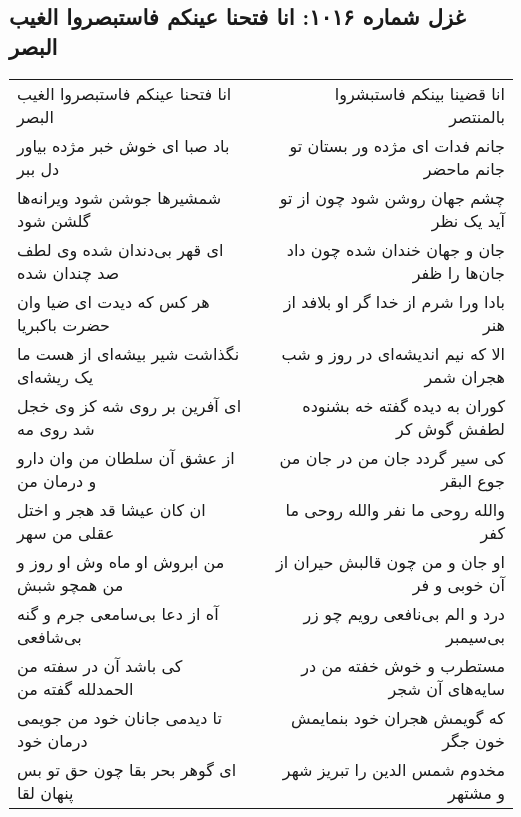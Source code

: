 \begin{center}
\section*{غزل شماره ۱۰۱۶: انا فتحنا عینکم فاستبصروا الغیب البصر}
\label{sec:1016}
\begin{longtable}{l p{0.5cm} r}
انا فتحنا عینکم فاستبصروا الغیب البصر
&&
انا قضینا بینکم فاستبشروا بالمنتصر
\\
باد صبا ای خوش خبر مژده بیاور دل ببر
&&
جانم فدات ای مژده ور بستان تو جانم ماحضر
\\
شمشیرها جوشن شود ویرانه‌ها گلشن شود
&&
چشم جهان روشن شود چون از تو آید یک نظر
\\
ای قهر بی‌دندان شده وی لطف صد چندان شده
&&
جان و جهان خندان شده چون داد جان‌ها را ظفر
\\
هر کس که دیدت ای ضیا وان حضرت باکبریا
&&
بادا ورا شرم از خدا گر او بلافد از هنر
\\
نگذاشت شیر بیشه‌ای از هست ما یک ریشه‌ای
&&
الا که نیم اندیشه‌ای در روز و شب هجران شمر
\\
ای آفرین بر روی شه کز وی خجل شد روی مه
&&
کوران به دیده گفته خه بشنوده لطفش گوش کر
\\
از عشق آن سلطان من وان دارو و درمان من
&&
کی سیر گردد جان من در جان من جوع البقر
\\
ان کان عیشا قد هجر و اختل عقلی من سهر
&&
والله روحی ما نفر والله روحی ما کفر
\\
من ابروش او ماه وش او روز و من همچو شبش
&&
او جان و من چون قالبش حیران از آن خوبی و فر
\\
آه از دعا بی‌سامعی جرم و گنه بی‌شافعی
&&
درد و الم بی‌نافعی رویم چو زر بی‌سیمبر
\\
کی باشد آن در سفته من الحمدلله گفته من
&&
مستطرب و خوش خفته من در سایه‌های آن شجر
\\
تا دیدمی جانان خود من جویمی درمان خود
&&
که گویمش هجران خود بنمایمش خون جگر
\\
ای گوهر بحر بقا چون حق تو بس پنهان لقا
&&
مخدوم شمس الدین را تبریز شهر و مشتهر
\\
\end{longtable}
\end{center}
